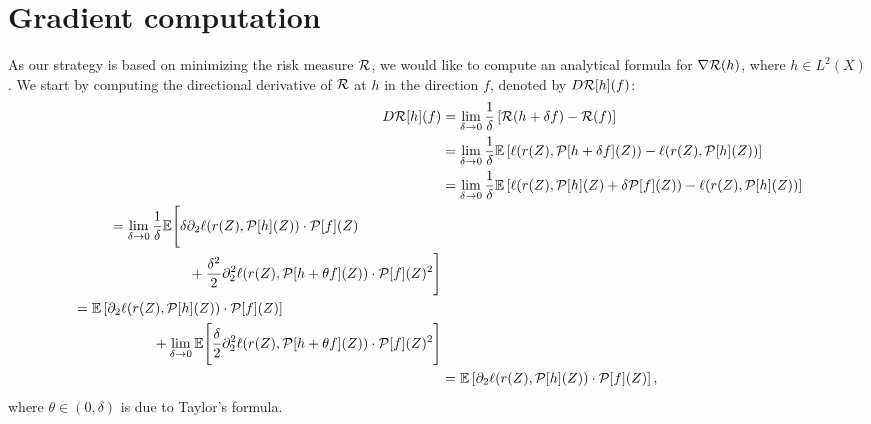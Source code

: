 \section{Gradient computation}
As our strategy is based on minimizing the risk measure $ \mathcal{R} $, we would like to compute an analytical formula for $ \nabla \mathcal{R} ( h ) $, where $ h \in L^2 ( X ) $.
We start by computing the directional derivative of $ \mathcal{R} $ at $ h $ in the direction $ f $, denoted by $ D \mathcal{R} [ h ] ( f ) $:
\begin{align*}
    D \mathcal{R} [ h ] ( f )
    &= \lim\limits_{ \delta \to 0 } \frac{ 1 }{ \delta } \left[
        \mathcal{R} ( h + \delta f ) - \mathcal{R} ( f )
    \right] \\
    &= \lim\limits_{ \delta \to 0 } \frac{ 1 }{ \delta } \mathbb{E} \left[
        \ell ( r ( Z ), \mathcal{P} [ h + \delta f ] ( Z ) )
        -
        \ell ( r ( Z ), \mathcal{P} [ h ] ( Z ) )
    \right] \\
    &= \lim\limits_{ \delta \to 0 } \frac{ 1 }{ \delta } \mathbb{E} \left[
        \ell ( r ( Z ), \mathcal{P} [ h ] ( Z ) + \delta \mathcal{P} [ f ] ( Z ) )
        -
        \ell ( r ( Z ), \mathcal{P} [ h ] ( Z ) )
    \right] \\
    \begin{split}
        &= \lim\limits_{ \delta \to 0 } \frac{ 1 }{ \delta } \mathbb{E} \Biggl[
            \delta \partial_{ 2 } \ell ( r ( Z ), \mathcal{P} [ h ] ( Z ) ) \cdot \mathcal{P} [ f ] ( Z ) \\
        &\hspace{2cm}+ \frac{ \delta^2 }{ 2 } \partial_{ 2 }^2 \ell ( r ( Z ) , \mathcal{P} [ h + \theta f ] ( Z ) ) \cdot \mathcal{P} [ f ] ( Z )^2
        \Biggr]
    \end{split} \\
    \begin{split}
        &= \mathbb{E} \left[
            \partial_{ 2 } \ell ( r ( Z ), \mathcal{P} [ h ] ( Z ) ) \cdot \mathcal{P} [ f ] ( Z )
        \right] \\
        &\hspace{2cm}+ \lim\limits_{ \delta \to 0 } \mathbb{E} \Biggl[
            \frac{ \delta }{ 2 } \partial_{ 2 }^2 \ell ( r ( Z ) , \mathcal{P} [ h + \theta f ] ( Z ) ) \cdot \mathcal{P} [ f ] ( Z )^2
        \Biggr]
    \end{split} \\
    &= \mathbb{E} \left[
        \partial_{ 2 } \ell ( r ( Z ), \mathcal{P} [ h ] ( Z ) ) \cdot \mathcal{P} [ f ] ( Z )
    \right]
,\end{align*}
where $ \theta \in ( 0, \delta ) $ is due to Taylor's formula.

